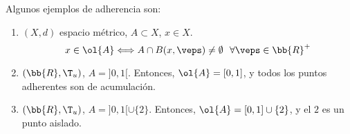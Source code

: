 \begin{ejemplo} Algunos ejemplos de adherencia son:
    \begin{enumerate}
        \item $(X,d)$ espacio métrico, $A\subset X$, $x\in X$.
        \begin{equation*}
            x\in \ol{A}\Longleftrightarrow A\cap B(x,\veps)\neq \emptyset~~\forall \veps\in \bb{R}^+
        \end{equation*}

        \item $(\bb{R},\T_u)$, $A=]0,1[$. Entonces, $\ol{A}=[0,1]$, y todos los puntos adherentes son de acumulación.

        \item $(\bb{R},\T_u)$, $A=]0,1[\cup \{2\}$. Entonces, $\ol{A}=[0,1]\cup \{2\}$, y el $2$ es un punto aislado.
    \end{enumerate}
\end{ejemplo}\vspace{1em}


